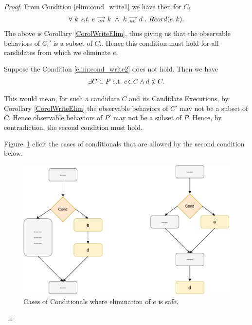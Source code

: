     \begin{proof}
    
        From Condition \ref{elim:cond_write1} we have then for $C_i$
        \begin{align*}
            \forall \ k \ \textit{s.t.} \ 
            \reln{e}{ao}{k} \ \wedge \ \reln{k}{ao}{d} \ . \ 
            Reord(e,k).
        \end{align*}
        The above is Corollary \ref{CorolWriteElim}, thus giving us that the observable behaviors of $C_i'$ is a subset of $C_i$. 
        Hence this condition must hold for all candidates from which we eliminate $e$. 
    
        Suppose the Condition \ref{elim:cond_write2} does not hold. 
        Then we have 
        \begin{align*}
            \exists C \in P \ \text{s.t.} \  e\!\in\!C \wedge d \notin C.
        \end{align*}
    
        This would mean, for such a candidate $C$ and its Candidate Executions, by Corollary \ref{CorolWriteElim} the observable behaviors of $C'$ may not be a subset of $C$. 
        Hence observable behaviors of $P'$ may not be a subset of $P$.
        Hence, by contradiction, the second condition must hold\footnotemark. 
    
        
        Figure~\ref{elim:cond} elicit the cases of conditionals that are allowed by the second condition below.
        \begin{figure}[H]
            \centering
            \includegraphics[scale=0.7]{6.Elimination/2.ValidEliminationProgram/Conditionals/ConditionalsCases.pdf}
            \caption{Cases of Conditionals where elimination of $e$ is safe.}
            \label{elim:cond}
        \end{figure}
    
    \end{proof}
    
